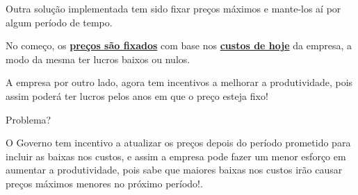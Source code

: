 \begin{frame}
	Outra solu\c c\~ao implementada tem sido fixar pre\c cos m\'aximos e mante-los a\'i por algum per\'iodo de tempo.\pause\par
	\vspace{0.2cm}

	No come\c co, os \textbf{\underline{pre\c cos s\~ao fixados}} com base nos \textbf{\underline{custos de hoje}} da empresa, a modo da mesma ter lucros baixos ou nulos.\par
	\vspace{0.2cm}
	A empresa por outro lado, agora tem incentivos a melhorar a produtividade, pois assim poder\'a ter lucros pelos anos em que o pre\c co esteja fixo!
\end{frame}

\begin{frame}
	Problema?\pause\par

	\vspace{0.5cm}

	{\centering \Large O Governo tem incentivo a atualizar os pre\c cos depois do per\'iodo prometido para incluir as baixas nos custos, e assim a empresa pode fazer um menor esfor\c co em aumentar a produtividade, pois sabe que maiores baixas nos custos ir\~ao causar pre\c cos m\'aximos menores no pr\'oximo per\'iodo!.
	}
\end{frame}